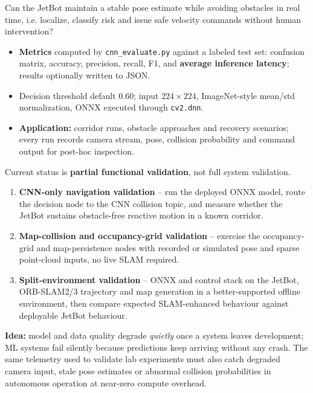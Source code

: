 {
Can the JetBot maintain a stable pose estimate while avoiding obstacles in real time, i.e. localize, classify risk and issue safe velocity commands without human intervention?
	\vspace{0.4em}
	\begin{itemize}
		\item \textbf{Metrics} computed by \texttt{cnn\_evaluate.py} against a labeled test set: confusion matrix, accuracy, precision, recall, F1, and \textbf{average inference latency}; results optionally written to JSON.
		\item Decision threshold default $0.60$; input $224\times224$, ImageNet-style mean/std normalization, ONNX executed through \texttt{cv2.dnn}.
		\item \textbf{Application:} corridor runs, obstacle approaches and recovery scenarios; every run records camera stream, pose, collision probability and command output for post-hoc inspection.
	\end{itemize}

}
{
	Current status is \textbf{partial functional validation}, not full system validation.
	\begin{enumerate}
		\item \textbf{CNN-only navigation validation} -- run the deployed ONNX model, route the decision node to the CNN collision topic, and measure whether the JetBot sustains obstacle-free reactive motion in a known corridor.
		\item \textbf{Map-collision and occupancy-grid validation} -- exercise the occupancy-grid and map-persistence nodes with recorded or simulated pose and sparse point-cloud inputs, no live SLAM required.
		\item \textbf{Split-environment validation} -- ONNX and control stack on the JetBot, ORB-SLAM2/3 trajectory and map generation in a better-supported offline environment, then compare expected SLAM-enhanced behaviour against deployable JetBot behaviour.
	\end{enumerate}
}
{
	\textbf{Idea:} model and data quality degrade \emph{quietly} once a system leaves development; ML systems fail silently because predictions keep arriving without any crash. The same telemetry used to validate lab experiments must also catch degraded camera input, stale pose estimates or abnormal collision probabilities in autonomous operation at near-zero compute overhead.
}
